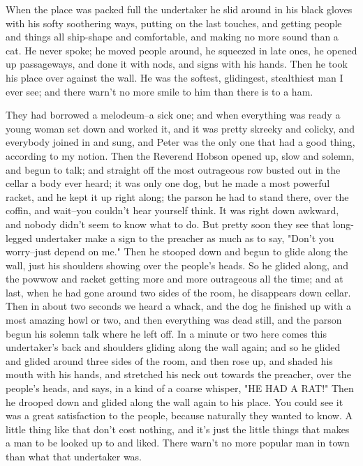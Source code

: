 When the place was packed full the undertaker he slid around in his black
gloves with his softy soothering ways, putting on the last touches, and
getting people and things all ship-shape and comfortable, and making no
more sound than a cat.  He never spoke; he moved people around, he
squeezed in late ones, he opened up passageways, and done it with nods,
and signs with his hands.  Then he took his place over against the wall.
He was the softest, glidingest, stealthiest man I ever see; and there
warn't no more smile to him than there is to a ham.

They had borrowed a melodeum--a sick one; and when everything was ready a
young woman set down and worked it, and it was pretty skreeky and
colicky, and everybody joined in and sung, and Peter was the only one
that had a good thing, according to my notion.  Then the Reverend Hobson
opened up, slow and solemn, and begun to talk; and straight off the most
outrageous row busted out in the cellar a body ever heard; it was only
one dog, but he made a most powerful racket, and he kept it up right
along; the parson he had to stand there, over the coffin, and wait--you
couldn't hear yourself think.  It was right down awkward, and nobody
didn't seem to know what to do.  But pretty soon they see that
long-legged undertaker make a sign to the preacher as much as to say,
"Don't you worry--just depend on me."  Then he stooped down and begun to
glide along the wall, just his shoulders showing over the people's heads.
So he glided along, and the powwow and racket getting more and more
outrageous all the time; and at last, when he had gone around two sides
of the room, he disappears down cellar.  Then in about two seconds we
heard a whack, and the dog he finished up with a most amazing howl or
two, and then everything was dead still, and the parson begun his solemn
talk where he left off.  In a minute or two here comes this undertaker's
back and shoulders gliding along the wall again; and so he glided and
glided around three sides of the room, and then rose up, and shaded his
mouth with his hands, and stretched his neck out towards the preacher,
over the people's heads, and says, in a kind of a coarse whisper, "HE HAD
A RAT!"  Then he drooped down and glided along the wall again to his
place.  You could see it was a great satisfaction to the people, because
naturally they wanted to know.  A little thing like that don't cost
nothing, and it's just the little things that makes a man to be looked up
to and liked.  There warn't no more popular man in town than what that
undertaker was.

